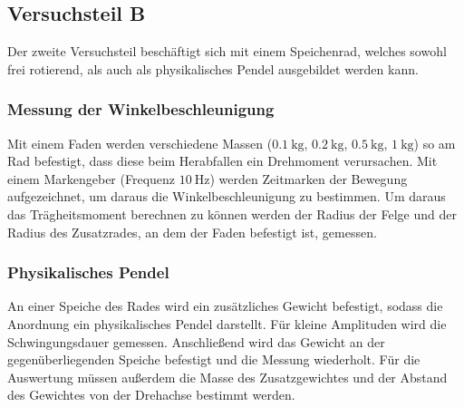 \subsection{Versuchsteil B}
Der zweite Versuchsteil beschäftigt sich mit einem Speichenrad, welches sowohl frei rotierend, als auch als physikalisches Pendel ausgebildet werden kann.
\subsubsection{Messung der Winkelbeschleunigung}
Mit einem Faden werden verschiedene Massen ($\SI{0,1}{\kg}$, $\SI{0,2}{\kg}$, $\SI{0,5}{\kg}$, $\SI{1}{\kg}$) so am Rad befestigt, dass diese beim Herabfallen ein Drehmoment verursachen. Mit einem Markengeber (Frequenz $\SI{10}{\hertz}$) werden Zeitmarken der Bewegung aufgezeichnet, um daraus die Winkelbeschleunigung zu bestimmen. Um daraus das Trägheitsmoment berechnen zu können werden der Radius der Felge und der Radius des Zusatzrades, an dem der Faden befestigt ist, gemessen.
\subsubsection{Physikalisches Pendel}
An einer Speiche des Rades wird ein zusätzliches Gewicht befestigt, sodass die Anordnung ein physikalisches Pendel darstellt. Für kleine Amplituden wird die Schwingungsdauer gemessen. Anschließend wird das Gewicht an der gegenüberliegenden Speiche befestigt und die Messung wiederholt. Für die Auswertung müssen außerdem die Masse des Zusatzgewichtes und der Abstand des Gewichtes von der Drehachse bestimmt werden.
